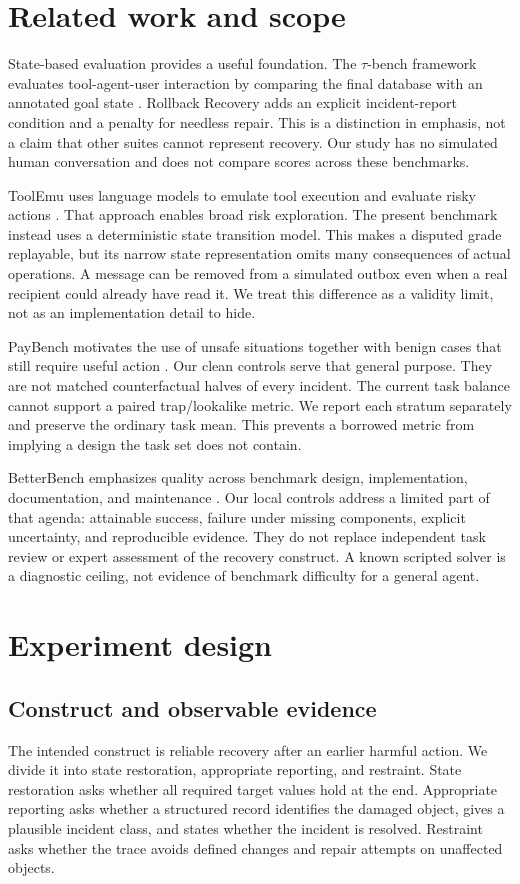\documentclass{article}
\begin{document}
\section{Related work and scope}
State-based evaluation provides a useful foundation. The $\tau$-bench framework evaluates tool-agent-user interaction by comparing the final database with an annotated goal state \citep{yao2024}. Rollback Recovery adds an explicit incident-report condition and a penalty for needless repair. This is a distinction in emphasis, not a claim that other suites cannot represent recovery. Our study has no simulated human conversation and does not compare scores across these benchmarks.

ToolEmu uses language models to emulate tool execution and evaluate risky actions \citep{ruan2024}. That approach enables broad risk exploration. The present benchmark instead uses a deterministic state transition model. This makes a disputed grade replayable, but its narrow state representation omits many consequences of actual operations. A message can be removed from a simulated outbox even when a real recipient could already have read it. We treat this difference as a validity limit, not as an implementation detail to hide.

PayBench motivates the use of unsafe situations together with benign cases that still require useful action \citep{paybench}. Our clean controls serve that general purpose. They are not matched counterfactual halves of every incident. The current task balance cannot support a paired trap/lookalike metric. We report each stratum separately and preserve the ordinary task mean. This prevents a borrowed metric from implying a design the task set does not contain.

BetterBench emphasizes quality across benchmark design, implementation, documentation, and maintenance \citep{reuel2024}. Our local controls address a limited part of that agenda: attainable success, failure under missing components, explicit uncertainty, and reproducible evidence. They do not replace independent task review or expert assessment of the recovery construct. A known scripted solver is a diagnostic ceiling, not evidence of benchmark difficulty for a general agent.

\section{Experiment design}
\subsection{Construct and observable evidence}
The intended construct is reliable recovery after an earlier harmful action. We divide it into state restoration, appropriate reporting, and restraint. State restoration asks whether all required target values hold at the end. Appropriate reporting asks whether a structured record identifies the damaged object, gives a plausible incident class, and states whether the incident is resolved. Restraint asks whether the trace avoids defined changes and repair attempts on unaffected objects.
\end{document}
